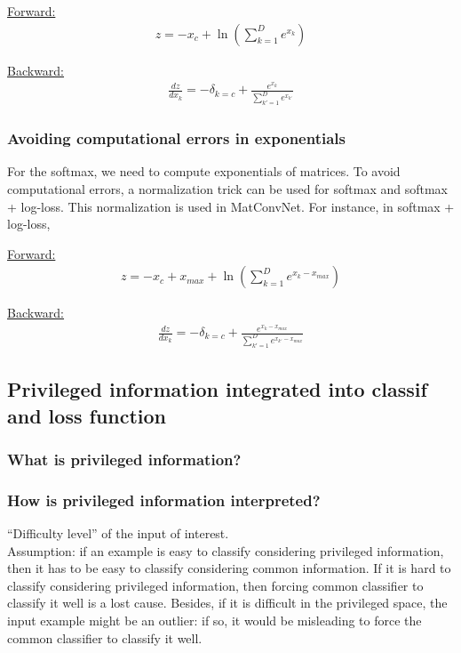 \noindent
\underline{Forward:} 
\begin{align}
 z = -x_c + \ln( \sum_{k=1}^D e^{x_k} ) \nonumber
\end{align}

\noindent
\underline{Backward:}
\begin{align}
 \frac{dz}{dx_k} = -\delta_{k=c} + \frac{e^{x_k}}{\sum_{k'=1}^D e^{x_{k'}}} \nonumber
\end{align}




\subsubsection{Avoiding computational errors in exponentials}

For the softmax, we need to compute exponentials of matrices. To avoid computational errors, a normalization trick can be used for 
softmax and softmax + log-loss. This normalization is used in MatConvNet. 
For instance, in softmax + log-loss, 

\noindent
\underline{Forward:} 
\begin{align}
  z = -x_c + x_{max} + \ln(\sum_{k=1}^D e^{x_k-x_{max}}) \nonumber
\end{align}

\noindent
\underline{Backward:}
\begin{align}
  \frac{dz}{dx_k} = -\delta_{k=c} + \frac{e^{x_k-x_{max}}}{\sum_{k'=1}^D e^{x_{k'}-x_{max}}} \nonumber
\end{align}
  







\subsection{Privileged information integrated into classif and loss function}

\subsubsection{What is privileged information?}


\subsubsection{How is privileged information interpreted?}
``Difficulty level'' of the input of interest.\\
Assumption: if an example is easy to classify considering privileged information, then it has to be easy to classify considering common information.
If it is hard to classify considering privileged information, then forcing common classifier to classify it well is a lost cause. Besides, if it is 
difficult in the privileged space, the input example might be an outlier: if so, it would be misleading to force the common classifier to classify it 
well. 

